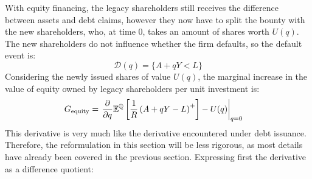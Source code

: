 \documentclass[main.tex]{subfiles}
\begin{document}
        With equity financing, the legacy shareholders still receives the difference between assets and debt claims,
        however they now have to split the bounty with the new shareholders, 
        who, at time 0, takes an amount of shares worth $U(q)$. 
        The new shareholders do not influence whether the firm defaults, so the default event is:
            \begin{equation*}
                \mathcal{D}(q)
                = 
                \{
                    A + qY < L
                \}
            \end{equation*}
        Considering the newly issued shares of value $U(q)$,
        the marginal increase in the value of equity owned by legacy shareholders per unit investment is:
            \begin{align}
                G_{\text{equity}} &=
                    \left.
                    \frac{
                        \partial 
                    }{
                        \partial 
                        q
                    }
                    \mathbb{E}^{\mathbb{Q}}\left[
                        \frac{1}{R} 
                        \left(
                            A + qY - L
                        \right)^{+}
                    \right]
                    -
                    U(q) 
                    \right\rvert_{q=0} 
                    \nonumber
            \end{align}
        This derivative is very much like the derivative encountered under debt issuance.
        Therefore, the reformulation in this section will be less rigorous,
        as most details have already been covered in the previous section.
        Expressing first the derivative as a difference quotient:
\end{document}
